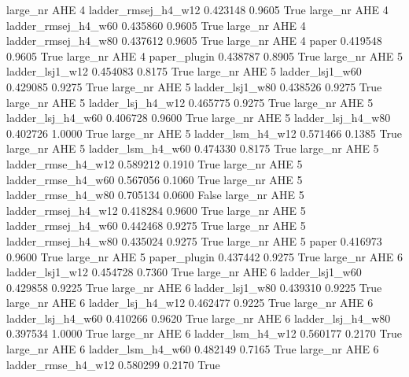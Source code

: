   large_nr      AHE                 4 ladder_rmsej_h4_w12   0.423148      0.9605    True
  large_nr      AHE                 4 ladder_rmsej_h4_w60   0.435860      0.9605    True
  large_nr      AHE                 4 ladder_rmsej_h4_w80   0.437612      0.9605    True
  large_nr      AHE                 4               paper   0.419548      0.9605    True
  large_nr      AHE                 4        paper_plugin   0.438787      0.8905    True
  large_nr      AHE                 5     ladder_lsj1_w12   0.454083      0.8175    True
  large_nr      AHE                 5     ladder_lsj1_w60   0.429085      0.9275    True
  large_nr      AHE                 5     ladder_lsj1_w80   0.438526      0.9275    True
  large_nr      AHE                 5   ladder_lsj_h4_w12   0.465775      0.9275    True
  large_nr      AHE                 5   ladder_lsj_h4_w60   0.406728      0.9600    True
  large_nr      AHE                 5   ladder_lsj_h4_w80   0.402726      1.0000    True
  large_nr      AHE                 5   ladder_lsm_h4_w12   0.571466      0.1385    True
  large_nr      AHE                 5   ladder_lsm_h4_w60   0.474330      0.8175    True
  large_nr      AHE                 5  ladder_rmse_h4_w12   0.589212      0.1910    True
  large_nr      AHE                 5  ladder_rmse_h4_w60   0.567056      0.1060    True
  large_nr      AHE                 5  ladder_rmse_h4_w80   0.705134      0.0600   False
  large_nr      AHE                 5 ladder_rmsej_h4_w12   0.418284      0.9600    True
  large_nr      AHE                 5 ladder_rmsej_h4_w60   0.442468      0.9275    True
  large_nr      AHE                 5 ladder_rmsej_h4_w80   0.435024      0.9275    True
  large_nr      AHE                 5               paper   0.416973      0.9600    True
  large_nr      AHE                 5        paper_plugin   0.437442      0.9275    True
  large_nr      AHE                 6     ladder_lsj1_w12   0.454728      0.7360    True
  large_nr      AHE                 6     ladder_lsj1_w60   0.429858      0.9225    True
  large_nr      AHE                 6     ladder_lsj1_w80   0.439310      0.9225    True
  large_nr      AHE                 6   ladder_lsj_h4_w12   0.462477      0.9225    True
  large_nr      AHE                 6   ladder_lsj_h4_w60   0.410266      0.9620    True
  large_nr      AHE                 6   ladder_lsj_h4_w80   0.397534      1.0000    True
  large_nr      AHE                 6   ladder_lsm_h4_w12   0.560177      0.2170    True
  large_nr      AHE                 6   ladder_lsm_h4_w60   0.482149      0.7165    True
  large_nr      AHE                 6  ladder_rmse_h4_w12   0.580299      0.2170    True
